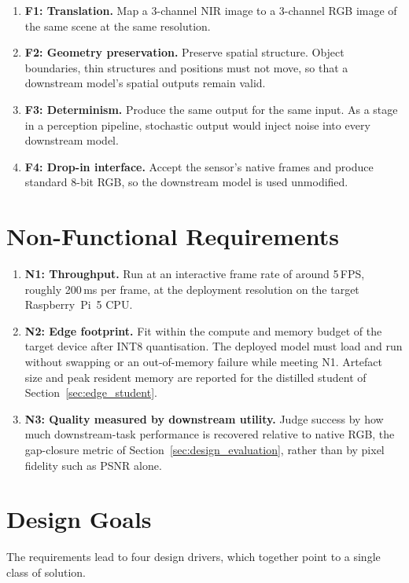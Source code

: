 \begin{enumerate}
    \item \textbf{F1: Translation.} Map a 3-channel NIR image to a 3-channel RGB image of the same scene at the same resolution.
    \item \textbf{F2: Geometry preservation.} Preserve spatial structure. Object boundaries, thin structures and positions must not move, so that a downstream model's spatial outputs remain valid.
    \item \textbf{F3: Determinism.} Produce the same output for the same input. As a stage in a perception pipeline, stochastic output would inject noise into every downstream model.
    \item \textbf{F4: Drop-in interface.} Accept the sensor's native frames and produce standard 8-bit RGB, so the downstream model is used unmodified.
\end{enumerate}

\section{Non-Functional Requirements}
\label{sec:req_nonfunctional}

\begin{enumerate}
    \item \textbf{N1: Throughput.} Run at an interactive frame rate of around 5\,FPS, roughly 200\,ms per frame, at the deployment resolution on the target Raspberry~Pi~5 CPU.
    \item \textbf{N2: Edge footprint.} Fit within the compute and memory budget of the target device after INT8 quantisation. The deployed model must load and run without swapping or an out-of-memory failure while meeting N1. Artefact size and peak resident memory are reported for the distilled student of Section~\ref{sec:edge_student}.
    \item \textbf{N3: Quality measured by downstream utility.} Judge success by how much downstream-task performance is recovered relative to native RGB, the gap-closure metric of Section~\ref{sec:design_evaluation}, rather than by pixel fidelity such as PSNR alone.
\end{enumerate}


\section{Design Goals}
\label{sec:design_goals}

The requirements lead to four design drivers, which together point to a single class of solution.

